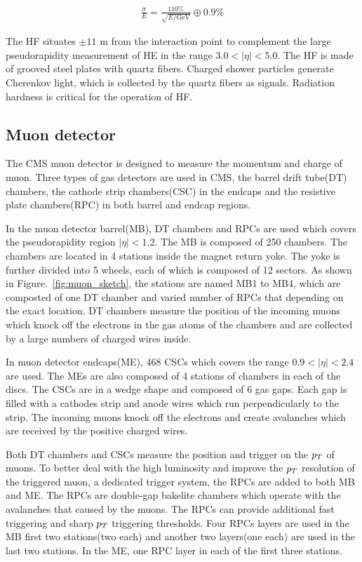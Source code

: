 \begin{align*}
\frac{\sigma}{E}=\frac{110\%}{\sqrt{E/\textrm{GeV}}}\oplus 0.9\%
\end{align*}

The HF situates $\pm11$ m from the interaction point to complement the large pseudorapidity measurement of HE in the range $3.0<|\eta|<5.0$. The HF is made of grooved steel plates with quartz fibers. Charged shower particles generate Cherenkov light, which is collected by the quartz fibers as signals. Radiation hardness is critical for the operation of HF.   



\subsection{Muon detector}
The CMS muon detector is designed to measure the momentum and charge of muon. Three types of gas detectors are used in CMS, the barrel drift tube(DT) chambers, the cathode strip chambers(CSC) in the endcaps and the resistive plate chambers(RPC) in both barrel and endcap regions. 

In the muon detector barrel(MB), DT chambers and RPCs are used which covers the pseudorapidity region $|\eta|<1.2$. The MB is composed of 250 chambers. The chambers are located in 4 stations inside the magnet return yoke. The yoke is further divided into 5 wheels, each of which is composed of 12 sectors. As shown in Figure.~\ref{fig:muon_sketch}, the stations are named MB1 to MB4, which are composted of one DT chamber and varied number of RPCs that depending on the exact location. DT chambers measure the position of the incoming muons which knock off the electrons in the gas atoms of the chambers and are collected by a large numbers of charged wires inside.%

In muon detector endcaps(ME), 468 CSCs which covers the range $0.9<|\eta|<2.4$ are used. The MEs are also composed of 4 stations of chambers in each of the discs. The CSCs are in a wedge shape and composed of 6 gas gaps. Each gap is filled with a cathodes strip and anode wires which run perpendicularly to the strip. The incoming muons knock off the electrons and create avalanches which are received by the positive charged wires. 

Both DT chambers and CSCs measure the position and trigger on the $p_{T}$ of muons. To better deal with the high luminosity and improve the $p_{T}$ resolution of the triggered muon, a dedicated trigger system, the RPCs are added to both MB and ME. The RPCs are double-gap bakelite chambers which operate with the avalanches that caused by the muons. The RPCs can provide additional fast triggering and sharp $p_{T}$ triggering thresholds. Four RPCs layers are used in the MB first two stations(two each) and another two layers(one each) are used in the last two stations.  In the ME, one RPC layer in each of the first three stations.    



